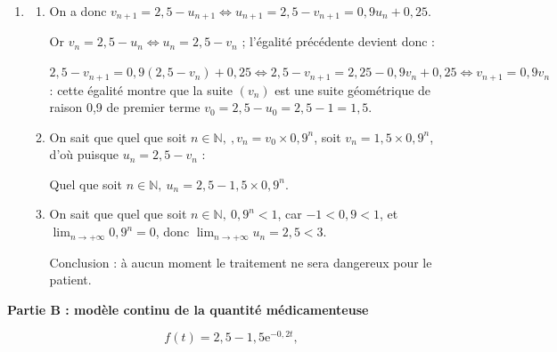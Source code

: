 \documentclass[10pt]{article}
\providecommand{\N}{\mathbb{N}}
\begin{document}
\begin{enumerate}
\begin{enumerate}
		\item 
		Le script renvoie $n = 8$,car $u_8 \approx 1,854 > 1,8$.
		
		Le médicament est réellement efficace après 4 heures.
	\end{enumerate}		
\item 
	\begin{enumerate}
		\item 
		On a donc $v_{n+1} = 2,5 - u_{n+1} \iff u_{n+1} = 2,5 - v_{n+1} = 0,9u_n + 0,25$.
		
		Or $v_n = 2,5 - u_n \iff u_n = 2,5 - v_n$ ; l'égalité précédente devient donc :
		
		$2,5 - v_{n+1} = 0,9\left(2,5 - v_n \right) + 0,25 \iff 2,5 - v_{n+1} = 2,25 - 0,9v_n + 0,25 \iff v_{n+1} = 0,9v_n$ : cette égalité montre que la suite $\left(v_n\right)$ est une suite géométrique de raison 0,9 de premier terme $v_0 = 2,5 - u_0 = 2,5 - 1 = 1,5$.
		\item 
		On sait que quel que soit $n \in \N,\:, v_n = v_0 \times 0,9^n$, soit $v_n = 1,5 \times 0,9^n$, d'où puisque $u_n = 2,5 - v_n$ :
		
Quel que soit $n \in \N, \: u_n = 2,5 - 1,5 \times 0,9^n$.
		\item 
		

On sait que quel que soit $n \in \N, \: 0,9^n < 1$, car $-1 < 0,9 < 1$, et $\displaystyle\lim_{n \to + \infty} 0,9^n = 0$, donc $\displaystyle\lim_{n \to + \infty}u_n =2,5 < 3$.

Conclusion : à aucun moment le traitement ne sera dangereux pour le patient.
	\end{enumerate}
\end{enumerate}

\bigskip

\textbf{Partie B : modèle continu de la quantité médicamenteuse}

\medskip








\[f(t) = 2,5 - 1,5\text{e}^{-0,2t},\]
\end{document}
